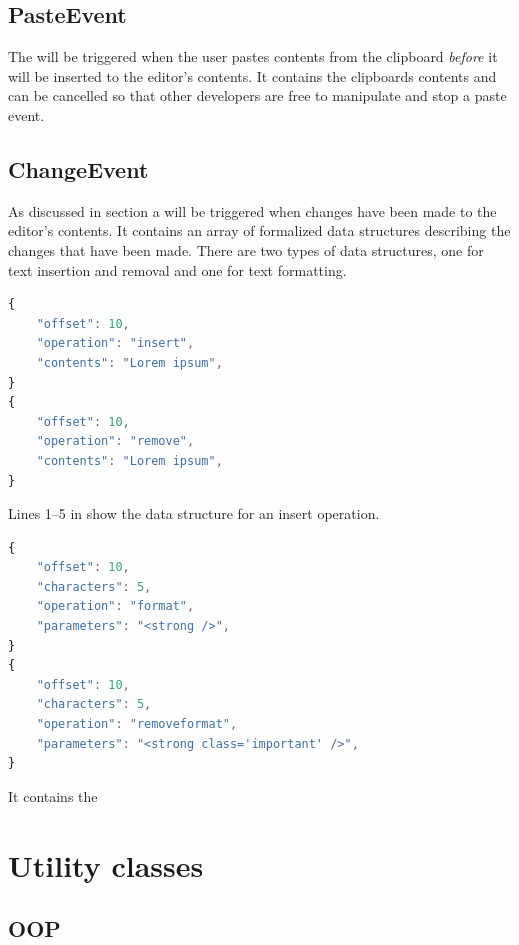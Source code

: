 \subsection{PasteEvent}
\label{subsec:paste_event}

The  will be triggered when the user pastes contents from the clipboard \textit{before} it will be inserted to the editor's contents. It contains the clipboards contents and can be cancelled so that other developers are free to manipulate and stop a paste event.

\subsection{ChangeEvent}
\label{subsec:change_event}

As discussed in section  a  will be triggered when changes have been made to the editor's contents. It contains an array of formalized data structures describing the changes that have been made. There are two types of data structures, one for text insertion and removal and one for text formatting.

\begin{lstlisting}[language=JavaScript, caption={Data structure for insert and remove operations}, label=lst:add_remove_structure]
{
    "offset": 10,
    "operation": "insert",
    "contents": "Lorem ipsum",
}
{
    "offset": 10,
    "operation": "remove",
    "contents": "Lorem ipsum",
}
\end{lstlisting}

Lines 1--5 in  show the data structure for an insert operation.

\begin{lstlisting}[language=JavaScript, caption={Change data structure}, label=lst:format_structure]
{
    "offset": 10,
    "characters": 5,
    "operation": "format",
    "parameters": "<strong />",
}
{
    "offset": 10,
    "characters": 5,
    "operation": "removeformat",
    "parameters": "<strong class='important' />",
}
\end{lstlisting}

It contains the 


\section{Utility classes}

\subsection{OOP}
\label{sec:oop_class}

